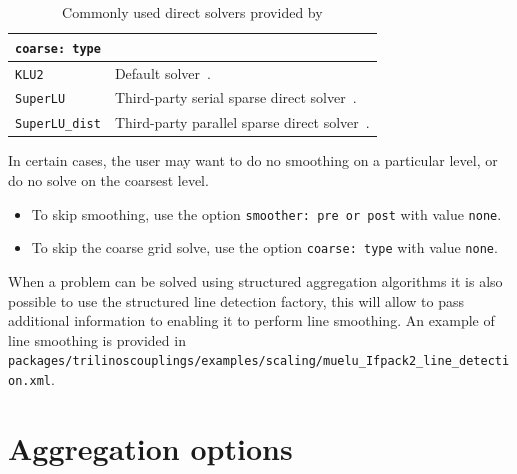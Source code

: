 \begin{table}[tbh]
  \begin{center}
    \begin{tabular}{p{4.0cm} p{9cm}}
      \toprule
      \texttt{coarse: type}             &  \\
      \midrule
      \verb|KLU2|                       & Default \amesostwo{} solver~\cite{amesos2_belos}. \\
      \verb|SuperLU|                    & Third-party serial sparse direct solver~\cite{Li2011}. \\
      \verb|SuperLU_dist|               & Third-party parallel sparse direct solver~\cite{Li2011}. \\
      \bottomrule
    \end{tabular}
    \caption{Commonly used direct solvers provided by \amesostwo{}}
\label{tab:coarse_solvers}
  \end{center}
\end{table}

In certain cases, the user may want to do no smoothing on a particular level, or do no solve on the coarsest level.
\begin{itemize}
  \item To skip smoothing, use the option \verb!smoother: pre or post! with value \verb!none!.
  \item To skip the coarse grid solve, use the option \verb!coarse: type! with value \verb!none!.
\end{itemize}

When a problem can be solved using structured aggregation algorithms it is also possible to use the structured line detection factory,
 this will allow \muelu{} to pass additional information to \ifpacktwo{} enabling it to perform line smoothing.
An example of line smoothing is provided in \texttt{packages/trilinoscouplings/examples/scaling/muelu\_Ifpack2\_line\_detection.xml}.



\section{Aggregation options}
\label{sec:options_aggregation}

